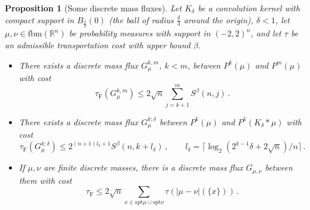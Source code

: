 \documentclass[10pt,a4paper,oneside,final]{article}
\newcommand{\R}{{\mathbb{R}}}
\newcommand{\fbm}{{\mathrm{fbm}}}
\newcommand{\spt}{{\mathrm{spt}}}
\newcommand{\JEnXia}[1][\tau]{#1_{\mathrm{F}}}%
\newcommand{\transportPath}{mass flux}
\newcommand{\transportPaths}{mass fluxes}
\numberwithin{equation}{section}
\theoremstyle{plain}
\newtheorem{proposition}[theorem]{Proposition}
\theoremstyle{definition}
\theoremstyle{remark}
\begin{document}
\begin{proposition}[Some discrete \transportPaths{}]\label{thm:discreteTransportPaths}
Let $K_\delta$ be a convolution kernel with compact support in $B_{\frac{\delta}{3}}(0)$ (the ball of radius $\frac\delta3$ around the origin), $\delta<1$, let $\mu,\nu\in\fbm(\R^n)$ be probability measures with support in $(-2,2)^n$, and let $\tau$ be an admissible transportation cost with upper bound $\beta$.
\begin{itemize}
\item There exists a discrete \transportPath{} $G_\mu^{k,m}$, $k<m$, between $P^k(\mu)$ and $P^m(\mu)$ with cost $$\JEnXia(G_\mu^{k,m})\leq2\sqrt n\sum_{j=k+1}^mS^\beta(n,j)\,.$$
\item There exists a discrete \transportPath{} $G_\mu^{k;\delta}$ between $P^k(\mu)$ and $P^k(K_\delta*\mu)$ with cost $$\JEnXia(G_\mu^{k;\delta})\leq2^{(n+1)l_\delta+1}S^\beta(n,k+l_\delta)\,,\qquad l_\delta=\lceil\log_2(2^{k-1}\delta+2\sqrt n)/n\rceil\,.$$
\item If $\mu,\nu$ are finite discrete masses, there is a discrete \transportPath{} $G_{\mu,\nu}$ between them with cost $$\JEnXia\leq2\sqrt n\sum_{x\in\spt\mu\cup\spt\nu}\tau(|\mu-\nu|(\{x\}))\,.$$
\end{itemize}
\end{proposition}
\end{document}
